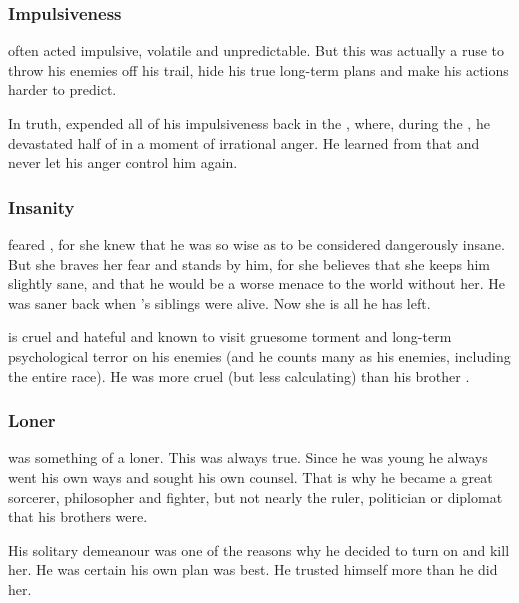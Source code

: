 \subsubsection{Impulsiveness}
\Ishnaruchaefir{} often acted impulsive, volatile and unpredictable. 
But this was actually a ruse to throw his enemies off his trail, hide his true long-term plans and make his actions harder to predict. 

In truth, \Ishnaruchaefir{} expended all of his impulsiveness back in the \secondbanewar, where, during the \SecondShrouding, he devastated half of \Miith{} in a moment of irrational anger. 
He learned from that and never let his anger control him again.





\subsubsection{Insanity}
\Criseis feared \Iscrafel, for she knew that he was \dash so wise as to be considered dangerously insane.
But she braves her fear and stands by him, for she believes that she keeps him slightly sane, and that he would be a worse menace to the world without her. 
He was saner back when \Criseis’s siblings were alive. 
Now she is all he has left. 

\Iscrafel is cruel and hateful and known to visit gruesome torment and long-term psychological terror on his enemies (and he counts many as his enemies, including the entire \resphan race). 
He was more cruel (but less calculating) than his brother \Secherdamon. 






\subsubsection{Loner}
\Ishnaruchaefir{} was something of a loner. 
This was always true. 
Since he was young he always went his own ways and sought his own counsel. 
That is why he became a great sorcerer, philosopher and fighter, but not nearly the ruler, politician or diplomat that his brothers were. 

His solitary demeanour was one of the reasons why he decided to turn on \Triestessakhin{} and kill her. 
He was certain his own plan was best. 
He trusted himself more than he did her. 

